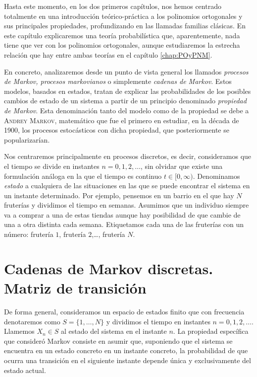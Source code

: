 %
%

Hasta este momento, en los dos primeros capítulos, nos hemos centrado totalmente en una introducción teórico-práctica a los polinomios ortogonales y sus principales propiedades, profundizando en las llamadas familias clásicas. En este capítulo explicaremos una teoría probabilística que, aparentemente, nada tiene que ver con los polinomios ortogonales, aunque estudiaremos la estrecha relación que hay entre ambas teorías en el capítulo \ref{chap:POyPNM}.

En concreto, analizaremos desde un punto de vista general los llamados \textit{procesos de Markov, procesos markovianos} o simplemente \textit{cadenas de Markov}. Estos modelos, basados en estados, tratan de explicar las probabilidades de los posibles cambios de estado de un sistema a partir de  un principio denominado \textit{propiedad de Markov}. Esta denominación tanto del modelo como de la propiedad se debe a \textsc{Andrey Markov}, matemático que fue el primero en estudiar, en la década de 1900, los procesos estocásticos con dicha propiedad, que posteriormente se popularizarían.

Nos centraremos principalmente en procesos discretos, es decir, consideramos que el tiempo se divide en instantes $n=0,1,2,\dots$, sin olvidar que existe una formulación análoga en la que el tiempo es continuo $t\in[0,\infty)$. Denominamos \textit{estado} a cualquiera de las situaciones en las que se puede encontrar el sistema en un instante determinado. Por ejemplo, pensemos en un barrio en el que hay $N$ fruterías y dividimos el tiempo en semanas. Asumimos que un individuo siempre va a comprar a una de estas tiendas aunque hay posibilidad de que cambie de una a otra distinta cada semana. Etiquetamos cada una de las fruterías con un número: frutería $1$, frutería $2$,\dots, frutería $N$.

\section{Cadenas de Markov discretas. Matriz de transición}

De forma general, consideramos un espacio de estados finito que con frecuencia denotaremos como $S=\{1,\dots, N\}$ y dividimos el tiempo en instantes $n=0,1,2,\dots$. Llamemos $X_n\in S$ al estado del sistema en el instante $n$. La propiedad específica que consideró Markov consiste en asumir que, suponiendo que el sistema se encuentra en un estado concreto en un instante concreto, la probabilidad de que ocurra una transición en el siguiente instante depende única y exclusivamente del estado actual.


